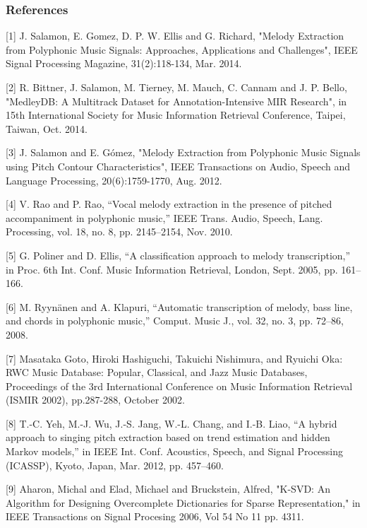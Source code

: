 \documentclass{article} %
\begin{document}
\subsubsection*{References}


\small{
[1] J. Salamon, E. Gomez, D. P. W. Ellis and G. Richard, "Melody Extraction from Polyphonic Music Signals: Approaches, Applications and Challenges", IEEE Signal Processing Magazine, 31(2):118-134, Mar. 2014.

[2] R. Bittner, J. Salamon, M. Tierney, M. Mauch, C. Cannam and J. P. Bello, "MedleyDB: A Multitrack Dataset for Annotation-Intensive MIR Research", in 15th International Society for Music Information Retrieval Conference, Taipei, Taiwan, Oct. 2014.

[3] J. Salamon and E. Gómez, "Melody Extraction from Polyphonic Music Signals using Pitch Contour Characteristics", IEEE Transactions on Audio, Speech and Language Processing, 20(6):1759-1770, Aug. 2012.

[4] V. Rao and P. Rao, “Vocal melody extraction in the presence of pitched accompaniment
in polyphonic music,” IEEE Trans. Audio, Speech, Lang. Processing, vol. 18,
no. 8, pp. 2145–2154, Nov. 2010. 

[5] G. Poliner and D. Ellis, “A classification approach to melody transcription,” in Proc. 6th Int. Conf. Music Information Retrieval, London, Sept. 2005, pp. 161–166. 

[6] M. Ryynänen and A. Klapuri, “Automatic transcription of melody, bass line, and chords in polyphonic music,” Comput. Music J., vol. 32, no. 3, pp. 72–86, 2008. 

[7] Masataka Goto, Hiroki Hashiguchi, Takuichi Nishimura, and Ryuichi Oka: RWC Music Database: Popular, Classical, and Jazz Music Databases, Proceedings of the 3rd International Conference on Music Information Retrieval (ISMIR 2002), pp.287-288, October 2002. 

[8] T.-C. Yeh, M.-J. Wu, J.-S. Jang, W.-L. Chang, and I.-B. Liao, “A hybrid approach to singing pitch extraction based on trend estimation and hidden Markov models,” in IEEE Int. Conf. Acoustics, Speech, and Signal Processing (ICASSP), Kyoto, Japan, Mar. 2012, pp. 457–460.

[9] Aharon, Michal and Elad, Michael and Bruckstein, Alfred, "K-SVD: An Algorithm for Designing Overcomplete Dictionaries for Sparse Representation," in IEEE Transactions on Signal Procesing 2006, Vol 54 No 11 pp. 4311.
}
\end{document}
